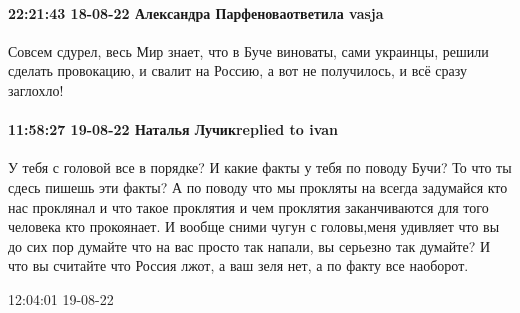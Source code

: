  
 
 
 
 

\paragraph{22:21:43 18-08-22 Александра Парфеноваответила vasja}

Совсем сдурел, весь Мир знает, что в Буче виноваты, сами украинцы, решили
сделать провокацию, и свалит на Россию, а вот не получилось, и всё сразу
заглохло!

\paragraph{11:58:27 19-08-22 Наталья Лучикreplied to ivan}

У тебя с головой все в порядке? И какие факты у тебя по поводу Бучи? То что ты
сдесь пишешь эти факты? А по поводу что мы прокляты на всегда задумайся кто нас
проклянал и что такое проклятия и чем проклятия заканчиваются для того человека
кто прокоянает. И вообще сними чугун с головы,меня удивляет что вы до сих пор
думайте что на вас просто так напали, вы серьезно так думайте? И что вы
считайте что Россия лжот, а ваш зеля нет, а по факту все наоборот.


12:04:01 19-08-22
